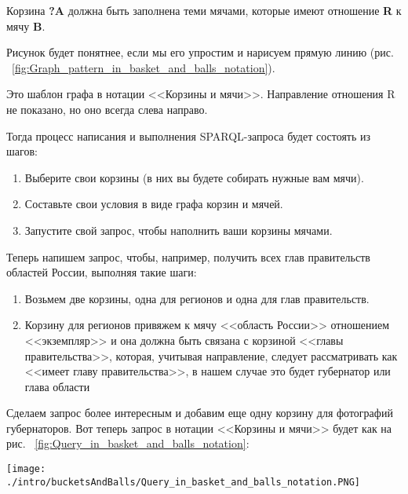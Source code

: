 Корзина \textbf{?A} должна быть заполнена теми мячами, которые имеют отношение \textbf{R} к мячу \textbf{B}.

Рисунок будет понятнее, если мы его упростим и нарисуем прямую линию (рис. ~\ref{fig:Graph_pattern_in_basket_and_balls_notation}). 

\begin{marginfigure}[1.0cm]
	{
		\setlength{\fboxsep}{0pt}%
		\setlength{\fboxrule}{1pt}%
	}
    \caption{Шаблон графа в нотации <<Корзины и мячи>>.}
	\label{fig:Graph_pattern_in_basket_and_balls_notation}
\end{marginfigure}

Это шаблон графа в нотации <<Корзины и мячи>>. Направление отношения R не показано, но оно всегда слева направо.

Тогда процесс написания и выполнения SPARQL-запроса будет состоять из шагов:
\begin{enumerate}
    \item Выберите свои корзины (в них вы будете собирать нужные вам мячи).
    \item Составьте свои условия в виде графа корзин и мячей.
    \item Запустите свой запрос, чтобы наполнить ваши корзины мячами.
\end{enumerate}

Теперь напишем запрос, чтобы, например, получить всех глав правительств областей России, выполняя такие шаги:

\begin{enumerate}
    \item Возьмем две корзины, одна для регионов и одна для глав правительств.
    \item Корзину для регионов привяжем к мячу <<область России>> отношением <<экземпляр>> и она должна быть связана с корзиной <<главы правительства>>, которая, учитывая направление, следует рассматривать как <<имеет главу правительства>>, в нашем случае это будет губернатор или глава области
\end{enumerate}

Сделаем запрос более интересным и добавим еще одну корзину для фотографий губернаторов. Вот теперь запрос в нотации <<Корзины и мячи>> будет как на рис. ~\ref{fig:Query_in_basket_and_balls_notation}:

\begin{figure*}[h!]
    \texttt{[image: ./intro/bucketsAndBalls/Query\_in\_basket\_and\_balls\_notation.PNG]}
    \caption{Корзины и мячи для заполнения корзин <<глав правительства>> мячами <<областей России>> и <<фотографиями>>.}
	\label{fig:Query_in_basket_and_balls_notation}
\end{figure*}

